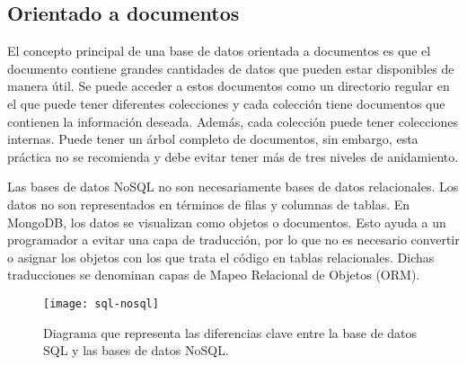 \subsection{Orientado a documentos}
El concepto principal de una base de datos orientada a documentos es que el documento contiene grandes cantidades de datos que pueden estar disponibles de manera útil. Se puede acceder a estos documentos como un directorio regular en el que puede tener diferentes colecciones y cada colección tiene documentos que contienen la información deseada. Además, cada colección puede tener colecciones internas. Puede tener un árbol completo de documentos, sin embargo, esta práctica no se recomienda y debe evitar tener más de tres niveles de anidamiento. 
\vspace{0.8cm}

Las bases de datos NoSQL no son necesariamente bases de datos relacionales. Los datos no son representados en términos de filas y columnas de tablas. En MongoDB, los datos se visualizan como objetos o documentos. Esto ayuda a un programador a evitar una capa de traducción, por lo que no es necesario convertir o asignar los objetos con los que trata el código en tablas relacionales. Dichas traducciones se denominan capas de Mapeo Relacional de Objetos (ORM).
\begin{figure}[H]
  \centering
  \texttt{[image: sql-nosql]}
  \caption{Diagrama que representa las diferencias clave entre la base de datos SQL y las bases de datos NoSQL.}
\end{figure}